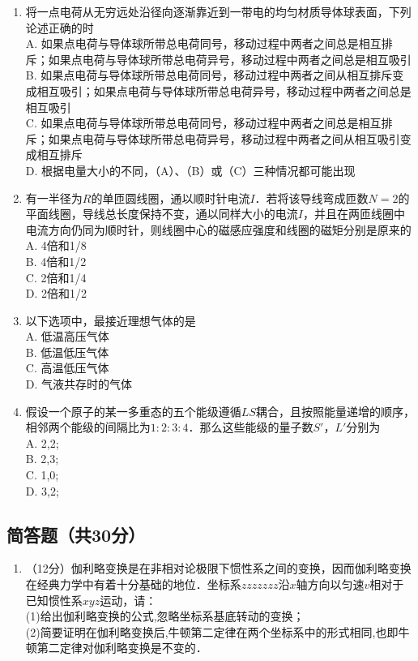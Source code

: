 \begin{enumerate}
\item 将一点电荷从无穷远处沿径向逐渐靠近到一带电的均匀材质导体球表面，下列论述正确的时\\
A. 如果点电荷与导体球所带总电荷同号，移动过程中两者之间总是相互排斥；如果点电荷与导体球所带总电荷异号，移动过程中两者之间总是相互吸引\\
B. 如果点电荷与导体球所带总电荷同号，移动过程中两者之间从相互排斥变成相互吸引；如果点电荷与导体球所带总电荷异号，移动过程中两者之间总是相互吸引\\
C. 如果点电荷与导体球所带总电荷同号，移动过程中两者之间总是相互排斥；如果点电荷与导体球所带总电荷异号，移动过程中两者之间从相互吸引变成相互排斥\\
D. 根据电量大小的不同，（A）、（B）或（C）三种情况都可能出现\\

\item 有一半径为$R$的单匝圆线圈，通以顺时针电流$I$．若将该导线弯成匝数$N=2$的平面线圈，导线总长度保持不变，通以同样大小的电流$I$，并且在两匝线圈中电流方向仍同为顺时针，则线圈中心的磁感应强度和线圈的磁矩分别是原来的\\
A. 4倍和1/8\\
B. 4倍和1/2\\
C. 2倍和1/4\\
D. 2倍和1/2\\

\item 以下选项中，最接近理想气体的是\\
A. 低温高压气体\\
B. 低温低压气体\\
C. 高温低压气体\\
D. 气液共存时的气体\\

\item 假设一个原子的某一多重态的五个能级遵循$LS$耦合，且按照能量递增的顺序，相邻两个能级的间隔比为$1:2:3:4$．那么这些能级的量子数$S'$，$L'$分别为\\
A. 2,2;\\
B. 2,3;\\
C. 1,0;\\
D. 3,2;\\
\end{enumerate}
\subsection{简答题（共30分）}
\begin{enumerate}
\item （12分）伽利略变换是在非相对论极限下惯性系之间的变换，因而伽利略变换在经典力学中有着十分基础的地位．坐标系$zzzzzzz$沿$x$轴方向以匀速$v$相对于已知惯性系$xyz$运动，请：\\
(1)给出伽利略变换的公式,忽略坐标系基底转动的变换；\\
(2)简要证明在伽利略变换后,牛顿第二定律在两个坐标系中的形式相同,也即牛顿第二定律对伽利略变换是不变的．\\
\end{enumerate}